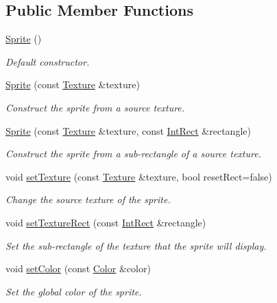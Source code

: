 \subsection*{Public Member Functions}
\begin{DoxyCompactItemize}
\item 
\hyperlink{classsf_1_1_sprite_a92559fbca895a96758abf5eabab96984}{Sprite} ()
\begin{DoxyCompactList}\small\item\em Default constructor. \end{DoxyCompactList}\item 
\hyperlink{classsf_1_1_sprite_a2a9fca374d7abf084bb1c143a879ff4a}{Sprite} (const \hyperlink{classsf_1_1_texture}{Texture} \&texture)
\begin{DoxyCompactList}\small\item\em Construct the sprite from a source texture. \end{DoxyCompactList}\item 
\hyperlink{classsf_1_1_sprite_a01cfe1402372d243dbaa2ffa96020206}{Sprite} (const \hyperlink{classsf_1_1_texture}{Texture} \&texture, const \hyperlink{classsf_1_1_rect}{Int\+Rect} \&rectangle)
\begin{DoxyCompactList}\small\item\em Construct the sprite from a sub-\/rectangle of a source texture. \end{DoxyCompactList}\item 
void \hyperlink{classsf_1_1_sprite_a3729c88d88ac38c19317c18e87242560}{set\+Texture} (const \hyperlink{classsf_1_1_texture}{Texture} \&texture, bool reset\+Rect=false)
\begin{DoxyCompactList}\small\item\em Change the source texture of the sprite. \end{DoxyCompactList}\item 
void \hyperlink{classsf_1_1_sprite_a3fefec419a4e6a90c0fd54c793d82ec2}{set\+Texture\+Rect} (const \hyperlink{classsf_1_1_rect}{Int\+Rect} \&rectangle)
\begin{DoxyCompactList}\small\item\em Set the sub-\/rectangle of the texture that the sprite will display. \end{DoxyCompactList}\item 
void \hyperlink{classsf_1_1_sprite_a14def44da6437bfea20c4df5e71aba4c}{set\+Color} (const \hyperlink{classsf_1_1_color}{Color} \&color)
\begin{DoxyCompactList}\small\item\em Set the global color of the sprite. \end{DoxyCompactList}\item 

\end{DoxyCompactItemize}
